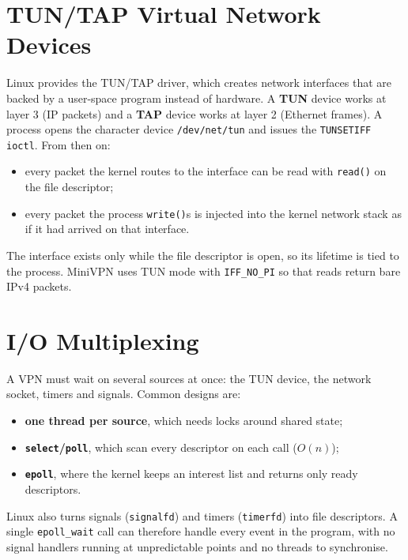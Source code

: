 \documentclass[12pt,a4paper]{report}
\begin{document}
\section{TUN/TAP Virtual Network Devices}
Linux provides the TUN/TAP driver, which creates network interfaces that are backed by
a user-space program instead of hardware. A \textbf{TUN} device works at layer 3 (IP
packets) and a \textbf{TAP} device works at layer 2 (Ethernet frames). A process opens
the character device \texttt{/dev/net/tun} and issues the \texttt{TUNSETIFF}
\texttt{ioctl}. From then on:
\begin{itemize}
  \item every packet the kernel routes to the interface can be read with \texttt{read()} on the file descriptor;
  \item every packet the process \texttt{write()}s is injected into the kernel network stack
        as if it had arrived on that interface.
\end{itemize}
The interface exists only while the file descriptor is open, so its lifetime is tied to
the process. MiniVPN uses TUN mode with \texttt{IFF\_NO\_PI} so that reads return bare
IPv4 packets.

\section{I/O Multiplexing}
A VPN must wait on several sources at once: the TUN device, the network socket, timers
and signals. Common designs are:
\begin{itemize}
  \item \textbf{one thread per source}, which needs locks around shared state;
  \item \textbf{\texttt{select}/\texttt{poll}}, which scan every descriptor on each call ($O(n)$);
  \item \textbf{\texttt{epoll}}, where the kernel keeps an interest list and returns only ready
        descriptors.
\end{itemize}
Linux also turns signals (\texttt{signalfd}) and timers (\texttt{timerfd}) into file
descriptors. A single \texttt{epoll\_wait} call can therefore handle every event in the
program, with no signal handlers running at unpredictable points and no threads to
synchronise.
\end{document}
